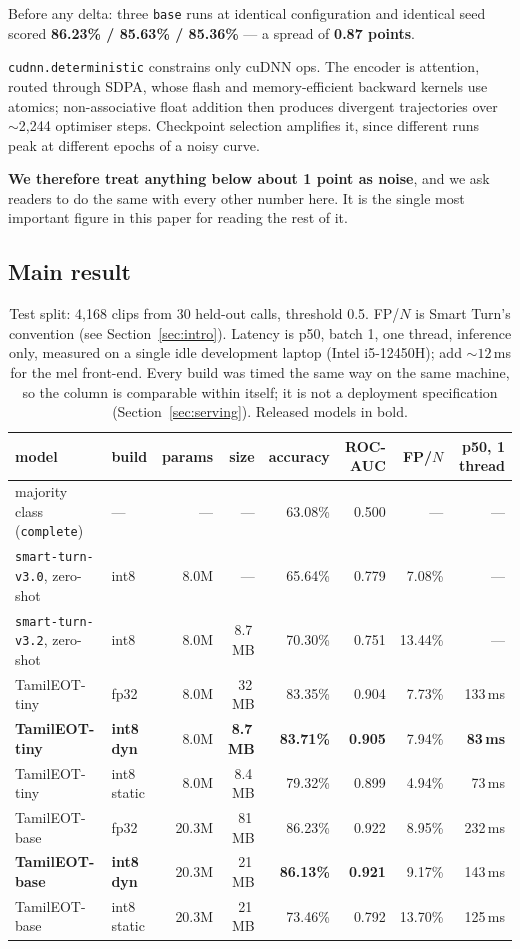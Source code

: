 \documentclass[11pt]{article}
\newcommand{\pct}{\%}
\begin{document}
Before any delta: three \texttt{base} runs at identical configuration and
identical seed scored \textbf{86.23\pct{} / 85.63\pct{} / 85.36\pct{}} --- a
spread of \textbf{0.87 points}.

\texttt{cudnn.deterministic} constrains only cuDNN ops. The encoder is
attention, routed through SDPA, whose flash and memory-efficient backward
kernels use atomics; non-associative float addition then produces divergent
trajectories over $\sim$2{,}244 optimiser steps. Checkpoint selection amplifies
it, since different runs peak at different epochs of a noisy curve.

\textbf{We therefore treat anything below about 1 point as noise}, and we ask
readers to do the same with every other number here. It is the single most
important figure in this paper for reading the rest of it.

\subsection{Main result}

\begin{table}[t]
\centering\small
\begin{tabular}{llrrrrrr}
\toprule
model & build & params & size & accuracy & ROC-AUC & FP/$N$ & p50, 1 thread \\
\midrule
majority class (\texttt{complete}) & --- & --- & --- & 63.08\pct & 0.500 & --- & --- \\
\texttt{smart-turn-v3.0}, zero-shot & int8 & 8.0M & --- & 65.64\pct & 0.779 & 7.08\pct & --- \\
\texttt{smart-turn-v3.2}, zero-shot & int8 & 8.0M & 8.7\,MB & 70.30\pct & 0.751 & 13.44\pct & --- \\
\midrule
TamilEOT-tiny & fp32 & 8.0M & 32\,MB & 83.35\pct & 0.904 & 7.73\pct & 133\,ms \\
\textbf{TamilEOT-tiny} & \textbf{int8 dyn} & 8.0M & \textbf{8.7\,MB} & \textbf{83.71\pct} & \textbf{0.905} & 7.94\pct & \textbf{83\,ms} \\
TamilEOT-tiny & int8 static & 8.0M & 8.4\,MB & 79.32\pct & 0.899 & 4.94\pct & 73\,ms \\
TamilEOT-base & fp32 & 20.3M & 81\,MB & 86.23\pct & 0.922 & 8.95\pct & 232\,ms \\
\textbf{TamilEOT-base} & \textbf{int8 dyn} & 20.3M & 21\,MB & \textbf{86.13\pct} & \textbf{0.921} & 9.17\pct & 143\,ms \\
TamilEOT-base & int8 static & 20.3M & 21\,MB & 73.46\pct & 0.792 & 13.70\pct & 125\,ms \\
\bottomrule
\end{tabular}
\caption{Test split: 4,168 clips from 30 held-out calls, threshold 0.5. FP/$N$
is Smart Turn's convention (see Section~\ref{sec:intro}). Latency is p50, batch 1, one thread,
inference only, measured on a single idle development laptop (Intel i5-12450H);
add ${\sim}12$\,ms for the mel front-end. Every build was timed the same way on
the same machine, so the column is comparable within itself; it is not a
deployment specification (Section~\ref{sec:serving}). Released models in bold.}
\label{tab:main}
\end{table}
\end{document}
